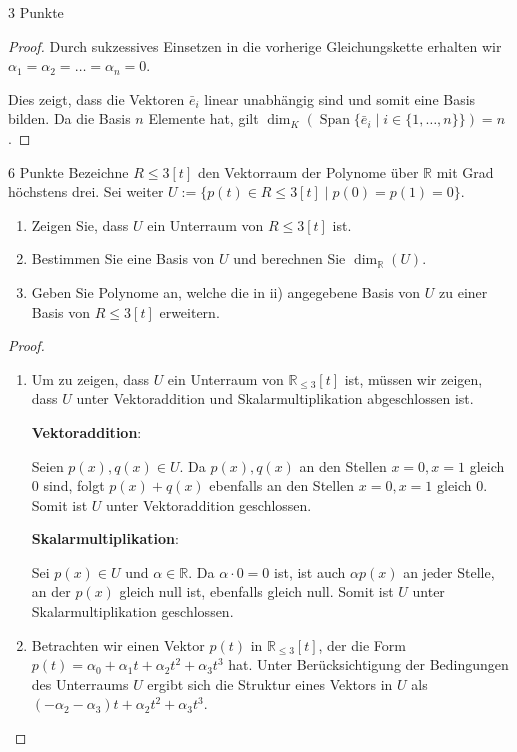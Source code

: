 \documentclass{../problemset}
\begin{document}
\begin{problem}{3 Punkte}
\begin{proof}
	Durch sukzessives Einsetzen in die vorherige Gleichungskette erhalten wir $\alpha_1 = \alpha_2 = \ldots = \alpha_n = 0$.

	Dies zeigt, dass die Vektoren $\bar{e}_i$ linear unabhängig sind und somit eine Basis bilden. Da die Basis $n$ Elemente hat, gilt $\dim_K(\operatorname{Span}\{\bar{e}_i \mid i \in \{1, \ldots, n\}\}) = n$.
\end{proof}
\end{problem}

\begin{problem}{6 Punkte}
Bezeichne $R\leq 3[t]$ den Vektorraum der Polynome über $\mathbb{R}$ mit Grad höchstens drei. Sei weiter $U := \{p(t) \in R\leq 3[t] \mid p(0) = p(1) = 0\}$.
\begin{enumerate}
	\item Zeigen Sie, dass $U$ ein Unterraum von $R\leq 3[t]$ ist.
	\item Bestimmen Sie eine Basis von $U$ und berechnen Sie $\dim_{\mathbb{R}}(U)$.
	\item Geben Sie Polynome an, welche die in ii) angegebene Basis von $U$ zu einer Basis von $R\leq 3[t]$ erweitern.
\end{enumerate}
\begin{proof}
	$ $

	\begin{enumerate}
		\item Um zu zeigen, dass $U$ ein Unterraum von $\mathbb{R}_{\leq 3}[t]$ ist, müssen wir zeigen, dass $U$ unter Vektoraddition und Skalarmultiplikation abgeschlossen ist.

		      \textbf{Vektoraddition}:

		      Seien $p(x), q(x) \in U$. Da $p(x), q(x)$ an den Stellen $x = 0, x = 1$ gleich 0 sind, folgt
		      $p(x) + q(x)$ ebenfalls an den Stellen $x = 0, x = 1$ gleich 0. Somit ist $U$ unter Vektoraddition geschlossen. \checkmark

		      \textbf{Skalarmultiplikation}:

		      Sei $p(x) \in U$ und $\alpha \in \mathbb{R}$. Da $\alpha \cdot 0 = 0$ ist, ist auch $\alpha p(x)$ an jeder Stelle, an der $p(x)$ gleich null ist, ebenfalls gleich null.
		      Somit ist $U$ unter Skalarmultiplikation geschlossen. \checkmark
		\item Betrachten wir einen Vektor $p(t)$ in $\mathbb{R}_{\leq 3}[t]$, der die Form $p(t) = \alpha_0 + \alpha_1t + \alpha_2t^2 + \alpha_3t^3$ hat.
		      Unter Berücksichtigung der Bedingungen des Unterraums $U$ ergibt sich die Struktur eines Vektors in $U$ als $(-\alpha_2 - \alpha_3)t + \alpha_2t^2 + \alpha_3t^3$.


\end{enumerate}
\end{proof}
\end{problem}
\end{document}
